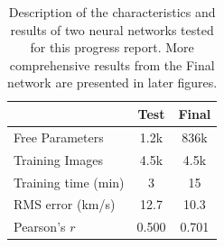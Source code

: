 \documentclass[10pt,letterpaper]{article}
\begin{document}
			\begin{table}[t!]
				
				\centering
				\begin{tabular}{| l | c c |}
					\hline
					& Test & Final \\ \hline
					Free Parameters & 1.2k & 836k \\
					Training Images & 4.5k & 4.5k \\				
					Training time (min) & 3 & 15 \\ 
					RMS error (km/s) & 12.7 & 10.3 \\
					Pearson's $r$ & 0.500 & 0.701 \\ \hline				
				\end{tabular}					
				\caption{Description of the characteristics and results of two neural networks tested for this progress report. More comprehensive results from the Final network are presented in later figures.}
				\label{nn_table}
				
			\end{table}
		
\end{document}
